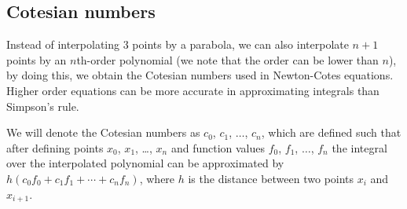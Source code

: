 \subsection{Cotesian numbers}
\label{sec:cotesian}
Instead of interpolating $3$ points by a parabola, we can also interpolate $n+1$ points by an $n$th-order polynomial (we note that the order can be lower than $n$), by doing this, we obtain the Cotesian numbers used in Newton-Cotes equations.
Higher order equations can be more accurate in approximating integrals than Simpson's rule.

We will denote the Cotesian numbers as $c_0$, $c_1$, $\dots$, $c_n$, which are defined such that after defining points $x_0$, $x_1$, \dots, $x_n$ and function values $f_0$, $f_1$, $\dots$, $f_n$ the integral over the interpolated polynomial can be approximated by $h(c_0f_0+c_1f_1+\cdots+c_nf_n)$, where $h$ is the distance between two points $x_i$ and $x_{i+1}$.

